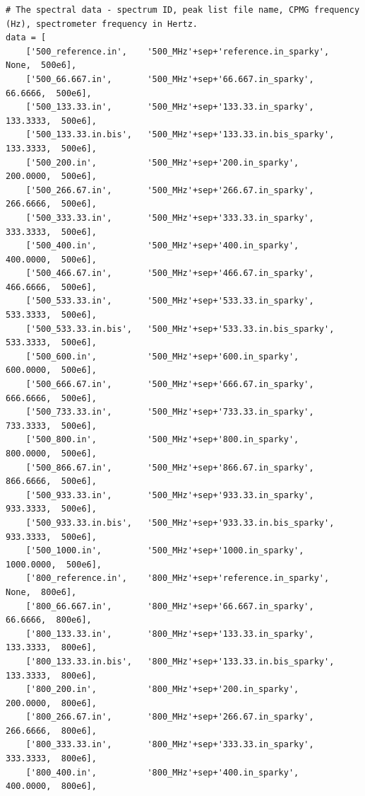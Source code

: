 \begin{lstlisting}[firstnumber=52]
# The spectral data - spectrum ID, peak list file name, CPMG frequency (Hz), spectrometer frequency in Hertz.
data = [
    ['500_reference.in',    '500_MHz'+sep+'reference.in_sparky',           None,  500e6],
    ['500_66.667.in',       '500_MHz'+sep+'66.667.in_sparky',           66.6666,  500e6],
    ['500_133.33.in',       '500_MHz'+sep+'133.33.in_sparky',          133.3333,  500e6],
    ['500_133.33.in.bis',   '500_MHz'+sep+'133.33.in.bis_sparky',      133.3333,  500e6],
    ['500_200.in',          '500_MHz'+sep+'200.in_sparky',             200.0000,  500e6],
    ['500_266.67.in',       '500_MHz'+sep+'266.67.in_sparky',          266.6666,  500e6],
    ['500_333.33.in',       '500_MHz'+sep+'333.33.in_sparky',          333.3333,  500e6],
    ['500_400.in',          '500_MHz'+sep+'400.in_sparky',             400.0000,  500e6],
    ['500_466.67.in',       '500_MHz'+sep+'466.67.in_sparky',          466.6666,  500e6],
    ['500_533.33.in',       '500_MHz'+sep+'533.33.in_sparky',          533.3333,  500e6],
    ['500_533.33.in.bis',   '500_MHz'+sep+'533.33.in.bis_sparky',      533.3333,  500e6],
    ['500_600.in',          '500_MHz'+sep+'600.in_sparky',             600.0000,  500e6],
    ['500_666.67.in',       '500_MHz'+sep+'666.67.in_sparky',          666.6666,  500e6],
    ['500_733.33.in',       '500_MHz'+sep+'733.33.in_sparky',          733.3333,  500e6],
    ['500_800.in',          '500_MHz'+sep+'800.in_sparky',             800.0000,  500e6],
    ['500_866.67.in',       '500_MHz'+sep+'866.67.in_sparky',          866.6666,  500e6],
    ['500_933.33.in',       '500_MHz'+sep+'933.33.in_sparky',          933.3333,  500e6],
    ['500_933.33.in.bis',   '500_MHz'+sep+'933.33.in.bis_sparky',      933.3333,  500e6],
    ['500_1000.in',         '500_MHz'+sep+'1000.in_sparky',           1000.0000,  500e6],
    ['800_reference.in',    '800_MHz'+sep+'reference.in_sparky',           None,  800e6],
    ['800_66.667.in',       '800_MHz'+sep+'66.667.in_sparky',           66.6666,  800e6],
    ['800_133.33.in',       '800_MHz'+sep+'133.33.in_sparky',          133.3333,  800e6],
    ['800_133.33.in.bis',   '800_MHz'+sep+'133.33.in.bis_sparky',      133.3333,  800e6],
    ['800_200.in',          '800_MHz'+sep+'200.in_sparky',             200.0000,  800e6],
    ['800_266.67.in',       '800_MHz'+sep+'266.67.in_sparky',          266.6666,  800e6],
    ['800_333.33.in',       '800_MHz'+sep+'333.33.in_sparky',          333.3333,  800e6],
    ['800_400.in',          '800_MHz'+sep+'400.in_sparky',             400.0000,  800e6],

\end{lstlisting}
